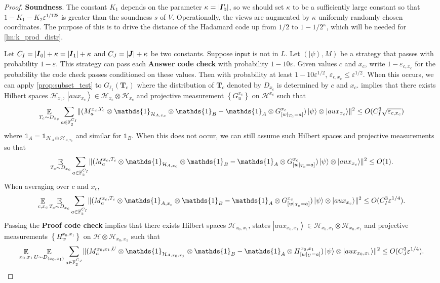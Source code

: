 \documentclass[10pt,a4paper]{article}
\theoremstyle{plain}
\theoremstyle{definition}
\newcommand {\set} [1] {\ensuremath{ \left\lbrace #1 \right\rbrace }}
\DeclarePairedDelimiter{\norm}{\lVert}{\rVert}
\DeclarePairedDelimiter{\abs}{\lvert}{\rvert}
\newcommand {\ket} [1] {\ensuremath{ \left| #1 \right\rangle }}
\DeclareMathOperator*{\bigE}{\mathbb{E}}
\newcommand {\id} {\ensuremath{\mathds{1}}}
\newcommand{\ep} {\ensuremath{\varepsilon}}
\newcommand{\x}{\otimes}
\newcommand{\calH}{\mathcal{H}}
\newcommand{\1}{\mathbb{1}} %
\newcommand{\bF}{\mathbb{F}}
\newcommand{\bI}{\pmb{I}}
\newcommand{\bJ}{\pmb{J}}
\newcommand{\bT}{\pmb{T}}
\newcommand{\ipt}{\mathsf{input}}
\begin{document}
\begin{proof}
\textbf{Soundness}. The constant $K_1$ depends on the parameter $\kappa = \abs{\bI_0'}$, so we should set $\kappa$ to be a sufficiently large constant so that $1 - K_1 - K_2 \ep^{1/128}$ is greater than the soundness $s$ of $V$.
Operationally, the views are augmented by $\kappa$ uniformly randomly chosen coordinates. The purpose of this is to drive the distance of the Hadamard code up from $1/2$ to $1 - 1/2^\kappa$, which will be needed for \cref{lm:k_prod_distr}. 

Let $C_I = \abs{\bI_0} + \kappa = \abs{\bI_1} + \kappa$ and $C_J = \abs{\bJ} + \kappa$ be two constants.
Suppose $\ipt$ is not in $L$. Let $(\ket{\psi}, M)$ be a strategy that
passes with probability $1 - \ep$.
This strategy can pass each \textbf{Answer code check} with probability $1 - 10\ep$. Given values $c$ and $x_c$,
write $1 - \ep_{c,x_c}$ for the probability the code check passes conditioned on these values.
Then with probability at least $1 - 10 \ep^{1/2}$, $\ep_{c,x_c} \leq \ep^{1/2}$.
When this occurs, we can apply \cref{prop:subset_test} to $G_{\ell_1}(\bT_c)$ where the distribution of 
$\bT_c$ denoted by $D_{x_c}$ is determined by $c$ and $x_c$.
 implies that there exists Hilbert spaces $\calH_{x_c}$, $\ket{aux_{x_c}} \in \calH_{x_c} \x \calH_{x_c}$
and projective measurement $\set{ G^{x_c}_u }$ on $\calH^{x_c}$ such that
\begin{align*}
	\bigE_{T_c \sim D_{x_c}} \sum_{a \in \bF_2^{C_I}} \norm{  (M^{x_c, T_c}_a \x \id_{\calH_{A, x_c}} \x \id_B -\id_A \x G^{x_c}_{[w|_{T_c} =a]})\ket{\psi} \x \ket{aux_{x_c}}}^2
	\leq O(C_I^3\sqrt{\ep_{c,x_c}})
\end{align*}
where $\id_A = \id_{\calH_A \x \calH_{A, x_c}}$ and similar for $\id_B$.
When this does not occur, we can still assume such Hilbert spaces and projective measurements so that
\begin{align*}
	\bigE_{T_c \sim D_{x_c}} \sum_{a \in \bF_2^{C_I}} \norm{  (M^{x_c, T_c}_a \x \id_{\calH_{A, x_c}} \x \id_B -\id_A \x G^{x_c}_{[w|_{T_c} =a]})\ket{\psi} \x \ket{aux_{x_c}}}^2
	\leq O(1).
\end{align*}
When averaging over $c$ and $x_c$, 
\begin{align*}
	\bigE_{c,x_c}\bigE_{T_c \sim D_{x_c}} \sum_{a \in \bF_2^{C_I}} \norm{  (M^{x_c, T_c}_a \x \id_{A,x_c} \x \id_B -\id_A \x G^{x_c}_{[w|_{T_c} =a]})\ket{\psi} \x \ket{aux_{x_c}}}^2 \leq O(C_I^3\ep^{1/4}).
\end{align*}
Passing the \textbf{Proof code check} implies that there exists Hilbert spaces $\calH_{x_0,x_1}$, states $\ket{aux_{x_0,x_1}} \in \calH_{x_0,x_1} \x \calH_{x_0,x_1}$
and projective measurements $\set{H^{x_0,x_1}_w}$ on $\calH \x \calH_{x_0,x_1}$ such that 
\begin{align*}
	\bigE_{x_0,x_1} \bigE_{U \sim D_{(x_0,x_1)}} \sum_{a \in \bF_2^{C_J}} \norm{  (M^{x_0,x_1, U}_a \x \id_{\calH_{A, x_0,x_1}} \x \id_B -\id_A \x H^{x_0,x_1}_{[w|_{U} =a]})\ket{\psi} \x \ket{aux_{x_0,x_1}}}^2 \leq O(C_J^3\ep^{1/4}).
\end{align*}


\end{proof}
\end{document}
